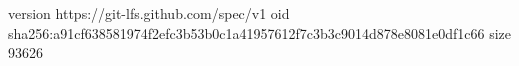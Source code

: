 version https://git-lfs.github.com/spec/v1
oid sha256:a91cf638581974f2efc3b53b0c1a41957612f7c3b3c9014d878e8081e0df1c66
size 93626
